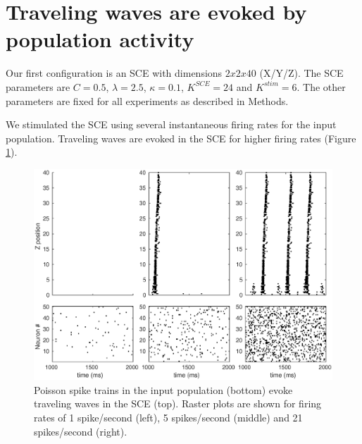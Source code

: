 \section{Traveling waves are evoked by population activity}
Our first configuration is an SCE with dimensions $2x2x40$ (X/Y/Z).
The SCE parameters are $C=0.5$, $\lambda=2.5$, $\kappa=0.1$, $K^{SCE}=24$ and $K^{stim}=6$.
The other parameters are fixed for all experiments as described in Methods.

We stimulated the SCE using several instantaneous firing rates for the input population.
Traveling waves are evoked in the SCE for higher firing rates (Figure \ref{fig:sce_raster}).

\begin{figure}[!htb]
 \centering
 \includegraphics[width=\textwidth]{fig/SCE_2x2_FRE_rasters}
 \caption{Poisson spike trains in the input population (bottom) evoke traveling waves in the SCE (top). Raster plots are shown for firing rates of 1 spike/second (left), 5 spikes/second (middle) and 21 spikes/second (right).  }
 \label{fig:sce_raster}
\end{figure}

\FloatBarrier

